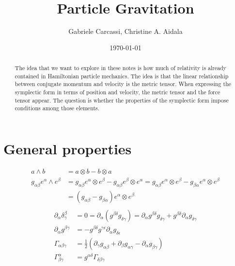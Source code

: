 \documentclass[11pt]{article}
\begin{document}
\title{Particle Gravitation}
\author{Gabriele Carcassi, Christine A. Aidala}

\date{\today}

\maketitle

\begin{abstract}
	The idea that we want to explore in these notes is how much of relativity is already contained in Hamiltonian particle mechanics. The idea is that the linear relationship between conjugate momentum and velocity is the metric tensor. When expressing the symplectic form in terms of position and velocity, the metric tensor and the force tensor appear. The question is whether the properties of the symplectic form impose conditions among those elements.
\end{abstract}

\section{General properties}
\begin{equation}
\begin{aligned}
a \wedge b &= a \otimes b - b \otimes a \\
g_{\alpha\beta} e^\alpha \wedge e^\beta &= g_{\alpha\beta} e^\alpha \otimes e^\beta - g_{\alpha\beta} e^\beta \otimes e^\alpha = g_{\alpha\beta} e^\alpha \otimes e^\beta - g_{\beta\alpha} e^\alpha \otimes e^\beta \\
&= (g_{\alpha\beta} - g_{\beta\alpha}) e^\alpha \otimes e^\beta \\
\end{aligned}
\end{equation}
\begin{equation}
\begin{aligned}
\partial_\alpha \delta^\beta_\gamma &= 0 = \partial_\alpha ( g^{\beta \delta} g_{\delta \gamma} ) = \partial_\alpha g^{\beta \delta} g_{\delta \gamma} + g^{\beta \delta} \partial_\alpha g_{\delta \gamma} \\
\partial_\alpha g^{\beta \gamma} &= - g^{\beta \delta} g^{\gamma \epsilon} \partial_\alpha g_{\delta \epsilon} \\
\Gamma_{\alpha \beta \gamma} &= \frac{1}{2} (\partial_\gamma g_{\alpha\beta} + \partial_\beta g_{\alpha\gamma} - \partial_\alpha g_{\beta\gamma}) \\
\Gamma^\alpha_{\beta\gamma} &= g^{\alpha \delta} \Gamma_{\delta\beta\gamma}
\end{aligned}
\end{equation}
\end{document}
